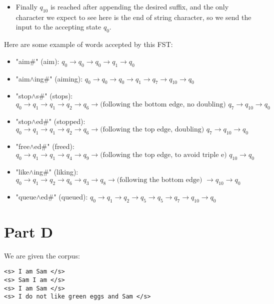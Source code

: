 \documentclass[11pt,journal]{article}
\begin{document}
\begin{itemize}
		\item Finally $q_{10}$ is reached after appending the desired suffix, and the only character we expect to see here is the end of string character, so we send the input to the accepting state $q_0$.
	
	\end{itemize}

	Here are some example of words accepted by this FST:
	\begin{itemize}
		\item "aim\#" (aim): $q_0 \rightarrow q_0 \rightarrow q_0 \rightarrow q_1 \rightarrow q_0$
		
		\item "aim$\wedge$ing\#" (aiming): $q_0 \rightarrow q_0\rightarrow q_0 \rightarrow  q_1 \rightarrow q_7 \rightarrow q_{10} \rightarrow q_0$
		
		\item "stop$\wedge$s\#" (stops): $q_0 \rightarrow q_1 \rightarrow q_1\rightarrow  q_2 \rightarrow  q_6 \rightarrow  \text{(following the bottom edge, no doubling) } q_7\rightarrow  q_{10} \rightarrow  q_0$
		
		\item "stop$\wedge$ed\#" (stopped): $q_0 \rightarrow q_1 \rightarrow  q_1 \rightarrow q_2 \rightarrow q_6 \rightarrow  \text{(following the top edge, doubling) } q_7\rightarrow  q_{10} \rightarrow  q_0$
		
		\item "free$\wedge$ed\#" (freed): $q_0\rightarrow q_1 \rightarrow  q_1 \rightarrow q_4 \rightarrow  q_9 \rightarrow \text{(following the top edge, to avoid triple e) } q_{10} \rightarrow  q_0$
		
		\item "like$\wedge$ing\#" (liking): $q_0 \rightarrow q_1 \rightarrow q_2\rightarrow q_6 \rightarrow  q_3 \rightarrow q_8 \rightarrow  \text{(following the bottom edge) } \rightarrow q_{10} \rightarrow  q_0$
		
		\item "queue$\wedge$ed\#" (queued): $q_0 \rightarrow q_1 \rightarrow q_2 \rightarrow q_5 \rightarrow q_5 \rightarrow q_7 \rightarrow q_{10} \rightarrow q_0$
	\end{itemize}
	\section{Part D}
	We are given the corpus:
	
	\begin{center}
		\texttt{<s> I am Sam </s>}\\
		\texttt{<s> Sam I am </s>}\\
		\texttt{<s> I am Sam </s>}\\
		\texttt{<s> I do not like green eggs and Sam </s>}
	\end{center}
\end{document}
